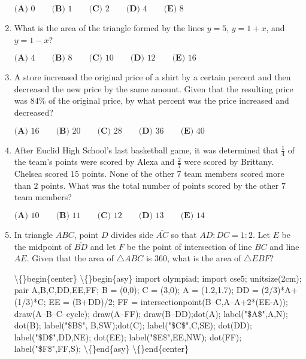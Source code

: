 \documentclass{article}
\begin{document}
\begin{enumerate}[label=\arabic*., itemsep=0.5em]
\(\textbf{(A) }0\qquad\textbf{(B) }1\qquad\textbf{(C) }2\qquad\textbf{(D) }4\qquad\textbf{(E) }8\)\par \vspace{0.5em}\item What is the area of the triangle formed by the lines \(y=5\), \(y=1+x\), and \(y=1-x\)?

\(\textbf{(A) }4\qquad\textbf{(B) }8\qquad\textbf{(C) }10\qquad\textbf{(D) }12\qquad\textbf{(E) }16\)\par \vspace{0.5em}\item A store increased the original price of a shirt by a certain percent and then decreased the new price by the same amount. Given that the resulting price was \(84\%\) of the original price, by what percent was the price increased and decreased?

\(\textbf{(A) }16\qquad\textbf{(B) }20\qquad\textbf{(C) }28\qquad\textbf{(D) }36\qquad\textbf{(E) }40\)\par \vspace{0.5em}\item After Euclid High School's last basketball game, it was determined that \(\frac{1}{4}\) of the team's points were scored by Alexa and \(\frac{2}{7}\) were scored by Brittany. Chelsea scored \(15\) points. None of the other \(7\) team members scored more than \(2\) points. What was the total number of points scored by the other \(7\) team members?

\(\textbf{(A) }10\qquad\textbf{(B) }11\qquad\textbf{(C) }12\qquad\textbf{(D) }13\qquad\textbf{(E) }14\)\par \vspace{0.5em}\item In triangle \(ABC\), point \(D\) divides side \(\overline{AC}\) so that \(AD:DC=1:2\). Let \(E\) be the midpoint of \(\overline{BD}\) and let \(F\) be the point of intersection of line \(BC\) and line \(AE\). Given that the area of \(\triangle ABC\) is \(360\), what is the area of \(\triangle EBF\)?


\textbackslash\{\}begin\{center\}
\textbackslash\{\}begin\{asy\}
import olympiad;
import cse5;
unitsize(2cm);
pair A,B,C,DD,EE,FF;
B = (0,0); C = (3,0); 
A = (1.2,1.7);
DD = (2/3)*A+(1/3)*C;
EE = (B+DD)/2;
FF = intersectionpoint(B--C,A--A+2*(EE-A));
draw(A--B--C--cycle);
draw(A--FF); 
draw(B--DD);dot(A); 
label("\$A\$",A,N);
dot(B); 
label("\$B\$",
B,SW);dot(C); 
label("\$C\$",C,SE);
dot(DD); 
label("\$D\$",DD,NE);
dot(EE); 
label("\$E\$",EE,NW);
dot(FF); 
label("\$F\$",FF,S);
\textbackslash\{\}end\{asy\}
\textbackslash\{\}end\{center\}




\end{enumerate}
\end{document}
